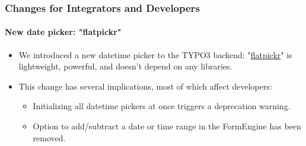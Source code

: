 %

\begin{frame}[fragile]
	\frametitle{Changes for Integrators and Developers}
	\framesubtitle{New date picker: "flatpickr"}

	\lstset{basicstyle=\tiny\ttfamily}

	\begin{itemize}
		\item We introduced a new datetime picker to the TYPO3 backend:\newline
			"\href{https://flatpickr.js.org/}{flatpickr}"
			is lightweight, powerful, and doesn't depend on any libraries.
		\item This change has several implications, most of which affect developers:

			\begin{itemize}\small
				\item Initializing all datetime pickers at once triggers a deprecation warning.
				\item Option to add/subtract a date or time range in the FormEngine has been removed.
			\end{itemize}

	\end{itemize}

\end{frame}

